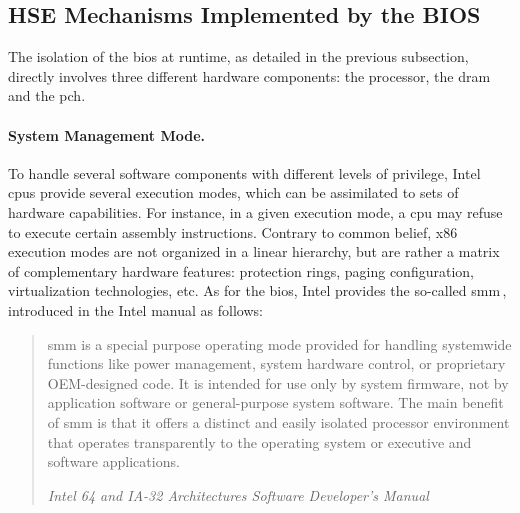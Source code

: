 \subsection{HSE Mechanisms Implemented by the BIOS}
\label{subsec:usecase:hse:smm}

The isolation of the \ac{bios} at runtime, as detailed in the previous
subsection, directly involves three different hardware components: the
processor, the \ac{dram} and the \ac{pch}. 

\paragraph{System Management Mode.}
%
To handle several software components with different levels of privilege, Intel
\acp{cpu} provide several execution modes, which can be assimilated to sets of
hardware capabilities.
%
For instance, in a given execution mode, a \ac{cpu} may refuse to execute
certain assembly instructions.
%
Contrary to common belief, x86 execution modes are not organized in a linear
hierarchy, but are rather a matrix of complementary hardware features:
protection rings, paging configuration, virtualization technologies, etc.
%
As for the \ac{bios}, Intel provides the so-called \ac{smm}\,\cite[Volume 3,
Chapter 34]{intel2014manual}, introduced in the Intel manual as follows:


\begin{quote}
  \ac{smm} is a special purpose operating mode provided for handling systemwide
  functions like power management, system hardware control, or proprietary
  OEM-designed code.
  It is intended for use only by system firmware, not by application software or
  general-purpose system software.
  The main benefit of \ac{smm} is that it offers a distinct and easily isolated
  processor environment that operates transparently to the operating system or
  executive and software applications.

  \hfill \small \emph{Intel 64 and IA-32 Architectures Software Developer’s
    Manual}
\end{quote}

